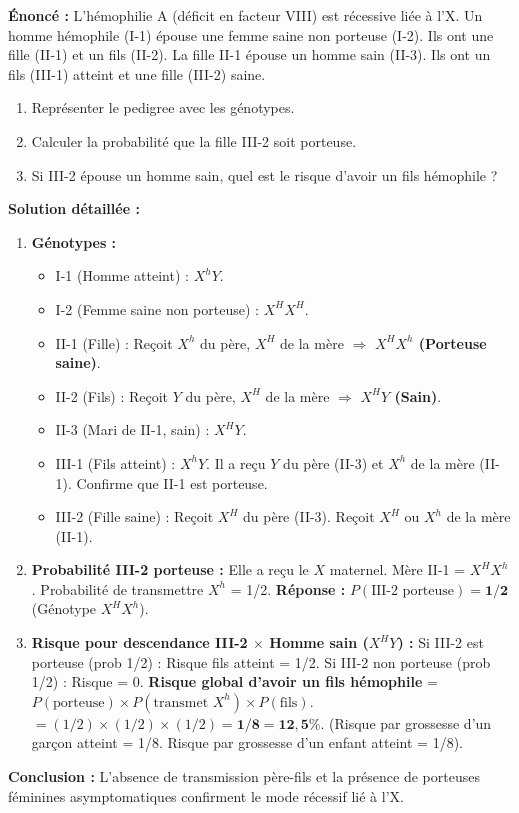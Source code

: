 \documentclass[11pt]{article}
\begin{document}
\begin{exoresolu}
    \textbf{Énoncé :} L'hémophilie A (déficit en facteur VIII) est récessive liée à l'X. Un homme hémophile (I-1) épouse une femme saine non porteuse (I-2). Ils ont une fille (II-1) et un fils (II-2). La fille II-1 épouse un homme sain (II-3). Ils ont un fils (III-1) atteint et une fille (III-2) saine.
    \begin{enumerate}
        \item Représenter le pedigree avec les génotypes.
        \item Calculer la probabilité que la fille III-2 soit porteuse.
        \item Si III-2 épouse un homme sain, quel est le risque d'avoir un fils hémophile ?
    \end{enumerate}
    \tcblower
    \textbf{Solution détaillée :}
    \begin{enumerate}
        \item \textbf{Génotypes :}
        \begin{itemize}
            \item I-1 (Homme atteint) : $X^h Y$.
            \item I-2 (Femme saine non porteuse) : $X^H X^H$.
            \item II-1 (Fille) : Reçoit $X^h$ du père, $X^H$ de la mère $\Rightarrow$ \textbf{$X^H X^h$ (Porteuse saine)}.
            \item II-2 (Fils) : Reçoit $Y$ du père, $X^H$ de la mère $\Rightarrow$ \textbf{$X^H Y$ (Sain)}.
            \item II-3 (Mari de II-1, sain) : \textbf{$X^H Y$}.
            \item III-1 (Fils atteint) : $X^h Y$. Il a reçu $Y$ du père (II-3) et $X^h$ de la mère (II-1). Confirme que II-1 est porteuse.
            \item III-2 (Fille saine) : Reçoit $X^H$ du père (II-3). Reçoit $X^H$ ou $X^h$ de la mère (II-1).
        \end{itemize}
        \item \textbf{Probabilité III-2 porteuse :} Elle a reçu le $X$ maternel. Mère II-1 = $X^H X^h$. Probabilité de transmettre $X^h$ = 1/2.
        \textbf{Réponse :} $P(\text{III-2 porteuse}) = \mathbf{1/2}$ (Génotype $X^H X^h$).
        \item \textbf{Risque pour descendance III-2 $\times$ Homme sain ($X^H Y$) :}
        Si III-2 est porteuse (prob 1/2) : Risque fils atteint = 1/2.
        Si III-2 non porteuse (prob 1/2) : Risque = 0.
        \textbf{Risque global d'avoir un fils hémophile} = $P(\text{porteuse}) \times P(\text{transmet } X^h) \times P(\text{fils})$.
        $= (1/2) \times (1/2) \times (1/2) = \mathbf{1/8 = 12,5\%}$.
        (Risque par grossesse d'un garçon atteint = 1/8. Risque par grossesse d'un enfant atteint = 1/8).
    \end{enumerate}
    \textbf{Conclusion :} L'absence de transmission père-fils et la présence de porteuses féminines asymptomatiques confirment le mode récessif lié à l'X.
\end{exoresolu}
\end{document}
